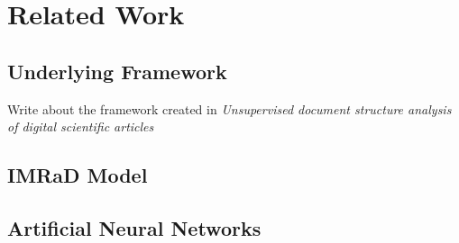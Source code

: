 \chapter{Related Work}
\label{cha:related-work}

\section{Underlying Framework}
\label{sec:underlying-framework}

Write about the framework created in \textit{Unsupervised document structure analysis of digital scientific articles}

\section{IMRaD Model}
\label{sec:imrad-model}

\section{Artificial Neural Networks}
\label{sec:artificial-neural-networks}